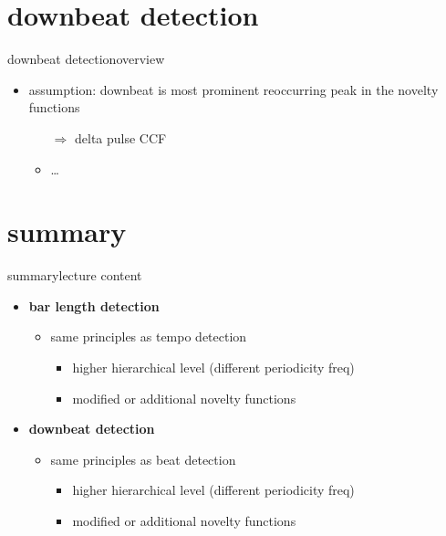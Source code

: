         \section[downbeat]{downbeat detection}
            \begin{frame}{downbeat detection}{overview}
                \begin{itemize}
                    \item	assumption: downbeat is most prominent reoccurring peak in the novelty functions
                        \begin{itemize}
                            \item[$\Rightarrow$]   delta pulse CCF
                            \item   \ldots
                        \end{itemize}
                \end{itemize}
            \end{frame}

    
    \section{summary}
        \begin{frame}{summary}{lecture content}
            \begin{itemize}
                \item   \textbf{bar length detection}
                    \begin{itemize}
                        \item   same principles as tempo detection
                            \begin{itemize}
                                \item   higher hierarchical level (different periodicity freq)
                                \item   modified or additional novelty functions
                            \end{itemize}
                    \end{itemize}
                \bigskip
                \item   \textbf{downbeat detection}
                    \begin{itemize}
                        \item   same principles as beat detection
                            \begin{itemize}
                                \item   higher hierarchical level (different periodicity freq)
                                \item   modified or additional novelty functions
                            \end{itemize}
                    \end{itemize}
            \end{itemize}
        \end{frame}


